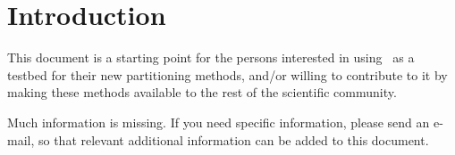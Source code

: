 
\section{Introduction}

This document is a starting point for the persons interested in using
\scotch\ as a testbed for their new partitioning methods, and/or
willing to contribute to it by making these methods available to the
rest of the scientific community.

Much information is missing. If you need specific information, please
send an e-mail, so that relevant additional information can be added
to this document.
